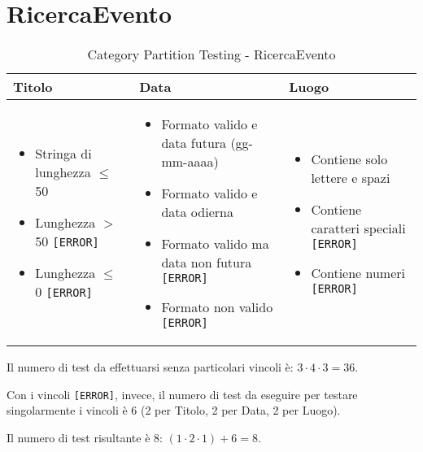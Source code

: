 \section{RicercaEvento}
\begin{table}[H]
	\centering
	\footnotesize
	\renewcommand{\arraystretch}{1.3}
	\begin{tabularx}{\textwidth}{|X|X|X|}
		\hline
		\textbf{Titolo} & \textbf{Data} & \textbf{Luogo} \\
		\hline
		\parbox[t]{\linewidth}{\begin{itemize}[leftmargin=*]
			\item Stringa di lunghezza $\leq$ 50 \checkmark
			\item Lunghezza $>$ 50 \texttt{[ERROR]}
			\item Lunghezza $\leq$ 0 \texttt{[ERROR]}
		\end{itemize}} &

		\parbox[t]{\linewidth}{\begin{itemize}[leftmargin=*]
			\item Formato valido e data futura (gg-mm-aaaa) \checkmark
			\item Formato valido e data odierna \checkmark
			\item Formato valido ma data non futura \texttt{[ERROR]}
			\item Formato non valido \texttt{[ERROR]}
		\end{itemize}} &
		\parbox[t]{\linewidth}{\begin{itemize}[leftmargin=*]
			\item Contiene solo lettere e spazi \checkmark
			\item Contiene caratteri speciali \texttt{[ERROR]}
			\item Contiene numeri \texttt{[ERROR]}
		\end{itemize}} \\
		\hline
	\end{tabularx}
	\caption{Category Partition Testing - RicercaEvento}
\end{table}
\noindent Il numero di test da effettuarsi senza particolari vincoli è:
$3 \cdot 4 \cdot 3 = 36$.

\noindent Con i vincoli \texttt{[ERROR]}, invece, il numero di test da eseguire per testare singolarmente i vincoli è 6 (2 per Titolo, 2 per Data, 2 per Luogo).

\noindent Il numero di test risultante è 8: $(1 \cdot 2 \cdot 1) + 6 = 8$.

